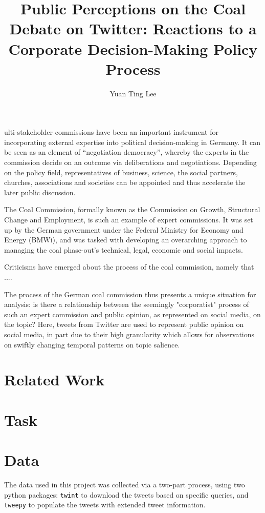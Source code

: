 \documentclass[9pt,twocolumn,twoside,lineno]{pnas-new}
\title{Public Perceptions on the Coal Debate on Twitter: Reactions to a Corporate Decision-Making Policy Process}
\author[a,b,1]{Yuan Ting Lee}
\affil[a]{Hertie School, Friedrichstr. 180, Berlin 10117, Germany}
\affil[b]{Mercator Research Institute on Global Commons and Climate Change, Torgauer Str. 12 - 15, Berlin 10829, Germany}
\begin{document}
\maketitle
\thispagestyle{firststyle}

ulti-stakeholder commissions have been an important instrument for incorporating external expertise into political decision-making in Germany. It can be seen as an element of “negotiation democracy”, whereby the experts in the commission decide on an outcome via deliberations and negotiations. Depending on the policy field, representatives of business, science, the social partners, churches, associations and societies can be appointed and thus accelerate the later public discussion. \cite{Siefken2016}

The Coal Commission, formally known as the Commission on Growth, Structural Change and Employment, is such an example of expert commissions. It was set up by the German government under the Federal Ministry for Economy and Energy (BMWi), and was tasked with developing an overarching approach to managing the coal phase-out’s technical, legal, economic and social impacts.

Criticisms have emerged about the process of the coal commission, namely that ....

The process of the German coal commission thus presents a unique situation for analysis: is there a relationship between the seemingly "corporatist" process of such an expert commission and public opinion, as represented on social media, on the topic? Here, tweets from Twitter are used to represent public opinion on social media, in part due to their high granularity which allows for observations on swiftly changing temporal patterns on topic salience.

\section*{Related Work}


\section*{Task}

\section*{Data}
The data used in this project was collected via a two-part process, using two python packages: \texttt{twint} to download the tweets based on specific queries, and \texttt{tweepy} to populate the tweets with extended tweet information. %
\end{document}
